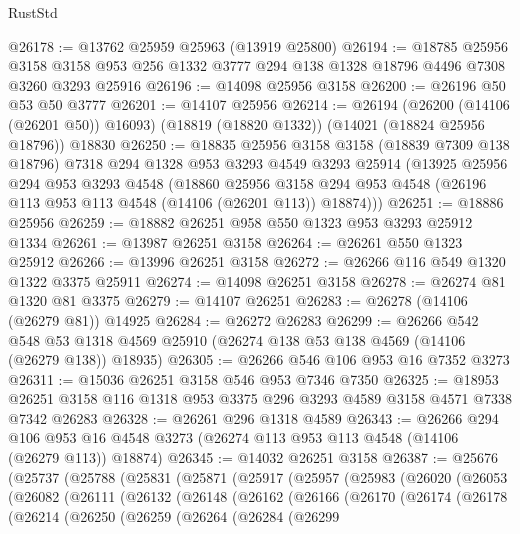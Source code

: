 \begin{lexlean}{RustStd}
\begin{coremodule}
@26178 := @13762 @25959 @25963 (@13919 @25800)
@26194 := @18785
    @25956
    @3158
    @3158
    @953
    @256
    @1332
    @3777
    @294
    @138
    @1328
    @18796
    @4496
    @7308
    @3260
    @3293
    @25916
@26196 := @14098 @25956 @3158
@26200 := @26196 @50 @53 @50 @3777
@26201 := @14107 @25956
@26214 := @26194
    (@26200 (@14106 (@26201 @50)) @16093)
    (@18819 (@18820 @1332))
    (@14021 (@18824 @25956 @18796))
    @18830
@26250 := @18835
    @25956
    @3158
    @3158
    (@18839 @7309 @138 @18796)
    @7318
    @294
    @1328
    @953
    @3293
    @4549
    @3293
    @25914
    (@13925
      @25956
      @294
      @953
      @3293
      @4548
      (@18860
        @25956
        @3158
        @294
        @953
        @4548
        (@26196 @113 @953 @113 @4548 (@14106 (@26201 @113)) @18874)))
@26251 := @18886 @25956
@26259 := @18882 @26251 @958 @550 @1323 @953 @3293 @25912 @1334
@26261 := @13987 @26251 @3158
@26264 := @26261 @550 @1323 @25912
@26266 := @13996 @26251 @3158
@26272 := @26266 @116 @549 @1320 @1322 @3375 @25911
@26274 := @14098 @26251 @3158
@26278 := @26274 @81 @1320 @81 @3375
@26279 := @14107 @26251
@26283 := @26278 (@14106 (@26279 @81)) @14925
@26284 := @26272 @26283
@26299 := @26266
    @542
    @548
    @53
    @1318
    @4569
    @25910
    (@26274 @138 @53 @138 @4569 (@14106 (@26279 @138)) @18935)
@26305 := @26266 @546 @106 @953 @16 @7352 @3273
@26311 := @15036 @26251 @3158 @546 @953 @7346 @7350
@26325 := @18953 @26251 @3158 @116 @1318 @953 @3375 @296 @3293 @4589 @3158 @4571 @7338 @7342 @26283
@26328 := @26261 @296 @1318 @4589
@26343 := @26266
    @294
    @106
    @953
    @16
    @4548
    @3273
    (@26274 @113 @953 @113 @4548 (@14106 (@26279 @113)) @18874)
@26345 := @14032 @26251 @3158
@26387 := @25676
    (@25737
      (@25788
        (@25831
          (@25871
            (@25917
              (@25957
                (@25983
                  (@26020
                    (@26053
                      (@26082
                        (@26111
                          (@26132
                            (@26148
                              (@26162
                                (@26166
                                  (@26170
                                    (@26174
                                      (@26178
                                        (@26214
                                          (@26250
                                            (@26259
                                              (@26264
                                                (@26284
                                                  (@26299

\end{coremodule}
\end{lexlean}
